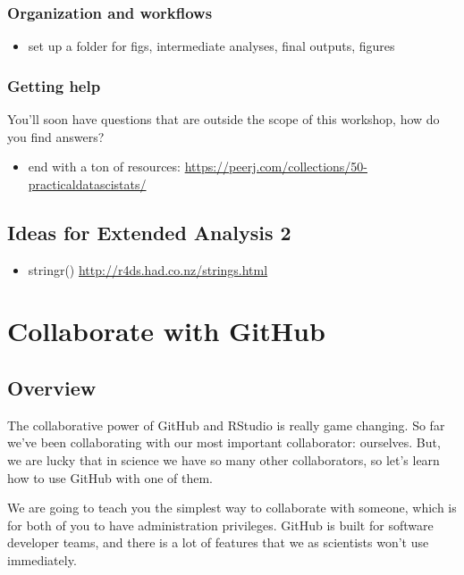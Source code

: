 \documentclass[]{book}
\providecommand{\tightlist}{%
  \setlength{\itemsep}{0pt}\setlength{\parskip}{0pt}}
\theoremstyle{definition}
\theoremstyle{definition}
\theoremstyle{definition}
\theoremstyle{remark}
\begin{document}
\subsection{Organization and
workflows}\label{organization-and-workflows}

\begin{itemize}
\tightlist
\item
  set up a folder for figs, intermediate analyses, final outputs,
  figures
\end{itemize}

\subsection{Getting help}\label{getting-help}

You'll soon have questions that are outside the scope of this workshop,
how do you find answers?

\begin{itemize}
\tightlist
\item
  end with a ton of resources:
  \url{https://peerj.com/collections/50-practicaldatascistats/}
\end{itemize}

\section{Ideas for Extended Analysis
2}\label{ideas-for-extended-analysis-2}

\begin{itemize}
\tightlist
\item
  stringr() \url{http://r4ds.had.co.nz/strings.html}
\end{itemize}

\chapter{Collaborate with GitHub}\label{collaborate}

\section{Overview}\label{overview-2}

The collaborative power of GitHub and RStudio is really game changing.
So far we've been collaborating with our most important collaborator:
ourselves. But, we are lucky that in science we have so many other
collaborators, so let's learn how to use GitHub with one of them.

We are going to teach you the simplest way to collaborate with someone,
which is for both of you to have administration privileges. GitHub is
built for software developer teams, and there is a lot of features that
we as scientists won't use immediately.
\end{document}
